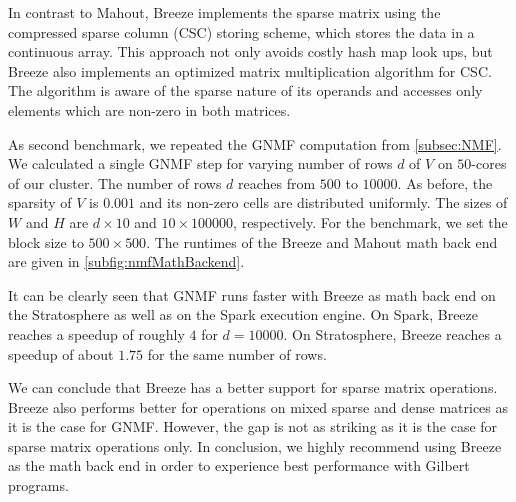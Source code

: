 In contrast to Mahout, Breeze implements the sparse matrix using the compressed sparse column (CSC) storing scheme, which stores the data in a continuous array.
This approach not only avoids costly hash map look ups, but Breeze also implements an optimized matrix multiplication algorithm for CSC.
The algorithm is aware of the sparse nature of its operands and accesses only elements which are non-zero in both matrices.

As second benchmark, we repeated the GNMF computation from \cref{subsec:NMF}.
We calculated a single GNMF step for varying number of rows $d$ of $V$ on $50$-cores of our cluster.
The number of rows $d$ reaches from $500$ to $10000$.
As before, the sparsity of $V$ is $0.001$ and its non-zero cells are distributed uniformly.
The sizes of $W$ and $H$ are $d\times 10$ and $10 \times 100000$, respectively.
For the benchmark, we set the block size to $500 \times 500$.
The runtimes of the Breeze and Mahout math back end are given in \cref{subfig:nmfMathBackend}.

It can be clearly seen that GNMF runs faster with Breeze as math back end on the Stratosphere as well as on the Spark execution engine.
On Spark, Breeze reaches a speedup of roughly $4$ for $d=10000$. 
On Stratosphere, Breeze reaches a speedup of about $1.75$ for the same number of rows.

We can conclude that Breeze has a better support for sparse matrix operations.
Breeze also performs better for operations on mixed sparse and dense matrices as it is the case for GNMF.
However, the gap is not as striking as it is the case for sparse matrix operations only.
In conclusion, we highly recommend using Breeze as the math back end in order to experience best performance with Gilbert programs.

